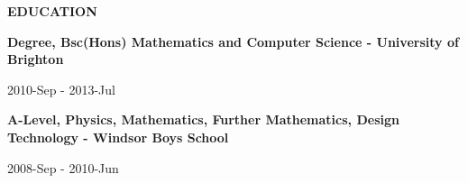 \documentclass[10pt, a4paper]{article}
\begin{document}
    \vspace*{0.5in}
    {\large {} \enspace \textbf{EDUCATION}} \par
    \textbf{Degree, Bsc(Hons) Mathematics and Computer Science - University of Brighton} \par
    \small 2010-Sep - 2013-Jul \par
    \vspace*{0.1in}
    \textbf{A-Level, Physics, Mathematics, Further Mathematics, Design Technology - Windsor Boys School} \par
    \small 2008-Sep - 2010-Jun \par
\end{document}
